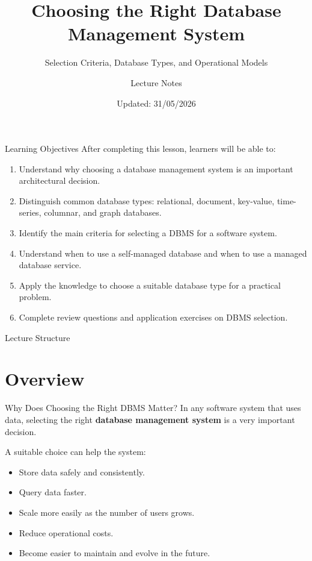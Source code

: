 \documentclass[aspectratio=169,11pt]{beamer}
\title[Choosing a DBMS]{Choosing the Right Database Management System}
\subtitle{Selection Criteria, Database Types, and Operational Models}
\author{Lecture Notes}
\institute{Course: Databases}
\date{Updated: 31/05/2026}
\newcommand{\keyword}[1]{\textcolor{accent}{\textbf{#1}}}
\newcommand{\kw}[1]{\keyword{#1}}
\newcommand{\smallitem}{\setlength{\itemsep}{2pt}\setlength{\parskip}{0pt}}
\begin{document}
\begin{frame}
  \titlepage
\end{frame}


\begin{frame}{Learning Objectives}
After completing this lesson, learners will be able to:
\begin{enumerate}
  \smallitem
  \item Understand why choosing a database management system is an important architectural decision.
  \item Distinguish common database types: relational, document, key-value, time-series, columnar, and graph databases.
  \item Identify the main criteria for selecting a DBMS for a software system.
  \item Understand when to use a self-managed database and when to use a managed database service.
  \item Apply the knowledge to choose a suitable database type for a practical problem.
  \item Complete review questions and application exercises on DBMS selection.
\end{enumerate}
\end{frame}

\begin{frame}[allowframebreaks]{Lecture Structure}
\small
\tableofcontents
\end{frame}

\section{Overview}

\begin{frame}{Why Does Choosing the Right DBMS Matter?}
In any software system that uses data, selecting the right \kw{database management system} is a very important decision.

\vspace{2mm}
A suitable choice can help the system:
\begin{itemize}
  \smallitem
  \item Store data safely and consistently.
  \item Query data faster.
  \item Scale more easily as the number of users grows.
  \item Reduce operational costs.
  \item Become easier to maintain and evolve in the future.
\end{itemize}
\end{frame}
\end{document}
